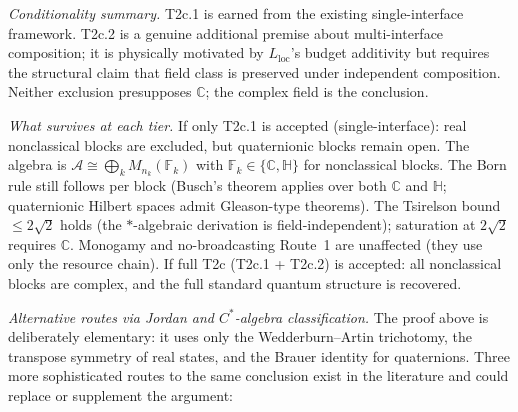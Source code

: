 \documentclass[11pt,a4paper]{article}
\theoremstyle{definition}
\begin{document}
\smallskip\noindent\textit{Conditionality summary.}  T2c.1 is earned from the existing single-interface framework.  T2c.2 is a genuine additional premise about multi-interface composition; it is physically motivated by $L_{\mathrm{loc}}$'s budget additivity but requires the structural claim that field class is preserved under independent composition.  Neither exclusion presupposes $\mathbb{C}$; the complex field is the conclusion.

\smallskip\noindent\textit{What survives at each tier.}  If only T2c.1 is accepted (single-interface): real nonclassical blocks are excluded, but quaternionic blocks remain open.  The algebra is $\mathcal{A} \cong \bigoplus_k M_{n_k}(\mathbb{F}_k)$ with $\mathbb{F}_k \in \{\mathbb{C}, \mathbb{H}\}$ for nonclassical blocks.  The Born rule still follows per block (Busch's theorem applies over both $\mathbb{C}$ and $\mathbb{H}$; quaternionic Hilbert spaces admit Gleason-type theorems).  The Tsirelson bound $\le 2\sqrt{2}$ holds (the $*$-algebraic derivation is field-independent); saturation at $2\sqrt{2}$ requires $\mathbb{C}$.  Monogamy and no-broadcasting Route~1 are unaffected (they use only the resource chain).  If full T2c (T2c.1 + T2c.2) is accepted: all nonclassical blocks are complex, and the full standard quantum structure is recovered.

\smallskip\noindent\textit{Alternative routes via Jordan and $C^*$-algebra classification.}  The proof above is deliberately elementary: it uses only the Wedderburn--Artin trichotomy, the transpose symmetry of real states, and the Brauer identity for quaternions.  Three more sophisticated routes to the same conclusion exist in the literature and could replace or supplement the argument:
\end{document}
